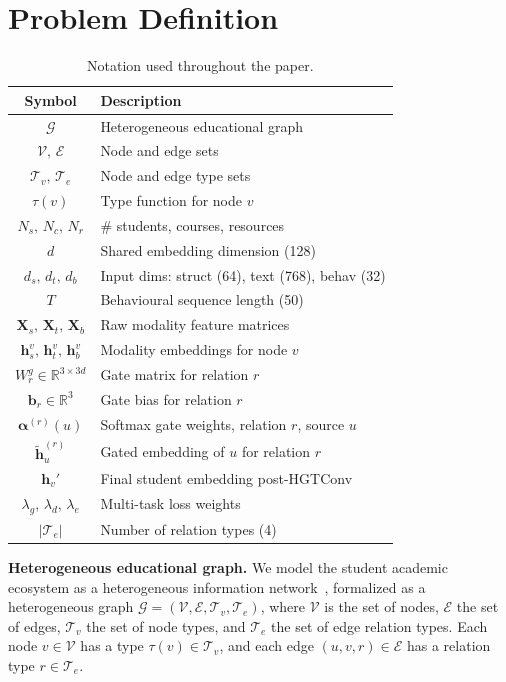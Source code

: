 \documentclass[sigconf]{acmart}
\begin{document}
\section{Problem Definition}
\label{sec:problem}
\begin{table}[t]
\centering
\caption{Notation used throughout the paper.}
\label{tab:notation}
\begin{tabular}{cl}
\toprule
\textbf{Symbol} & \textbf{Description} \\
\midrule
$\mathcal{G}$ & Heterogeneous educational graph \\
$\mathcal{V},\,\mathcal{E}$ & Node and edge sets \\
$\mathcal{T}_v,\,\mathcal{T}_e$ & Node and edge type sets \\
$\tau(v)$ & Type function for node $v$ \\
$N_s,\,N_c,\,N_r$ & \# students, courses, resources \\
$d$ & Shared embedding dimension (128) \\
$d_s,\,d_t,\,d_b$ & Input dims: struct (64), text (768), behav (32) \\
$T$ & Behavioural sequence length (50) \\
$\mathbf{X}_s,\,\mathbf{X}_t,\,\mathbf{X}_b$ & Raw modality feature matrices \\
$\mathbf{h}_s^v,\,\mathbf{h}_t^v,\,\mathbf{h}_b^v$ & Modality embeddings for node $v$ \\
$W_r^g \in \mathbb{R}^{3 \times 3d}$ & Gate matrix for relation $r$ \\
$\mathbf{b}_r \in \mathbb{R}^{3}$ & Gate bias for relation $r$ \\
$\boldsymbol{\alpha}^{(r)}(u)$ & Softmax gate weights, relation $r$, source $u$ \\
$\tilde{\mathbf{h}}_u^{(r)}$ & Gated embedding of $u$ for relation $r$ \\
$\mathbf{h}_v'$ & Final student embedding post-HGTConv \\
$\lambda_g,\,\lambda_d,\,\lambda_e$ & Multi-task loss weights \\
$|\mathcal{T}_e|$ & Number of relation types (4) \\
\bottomrule
\end{tabular}
\end{table}

\textbf{Heterogeneous educational graph.}
We model the student academic ecosystem as a
heterogeneous information network~\citep{sun2013mining},
formalized as a heterogeneous graph $\mathcal{G} = (\mathcal{V},
\mathcal{E}, \mathcal{T}_v, \mathcal{T}_e)$, where
$\mathcal{V}$ is the set of nodes, $\mathcal{E}$ the
set of edges, $\mathcal{T}_v$ the set of node types,
and $\mathcal{T}_e$ the set of edge relation types.
Each node $v \in \mathcal{V}$ has a type
$\tau(v) \in \mathcal{T}_v$, and each edge
$(u, v, r) \in \mathcal{E}$ has a relation type
$r \in \mathcal{T}_e$.
\end{document}
